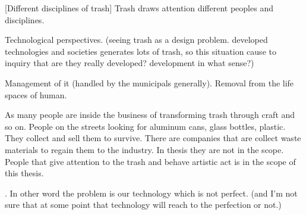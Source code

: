 %
%
[Different disciplines of trash] Trash draws attention different peoples and disciplines. 

 

Technological perspectives. (seeing trash as a design problem. developed technologies and societies generates lots of trash, so this situation cause to inquiry that are they really developed? development in what sense?)

Management of it (handled by the municipals generally). Removal from the life spaces of human.

As many people are inside the business of transforming trash through craft and so on. People on the streets looking for aluminum cans, glass bottles, plastic. They collect and sell them to survive. There are companies that are collect waste materials to regain them to the industry. In thesis they are not in the scope. People that give attention to the trash and behave artistic act is in the scope of this thesis.

  \cite{mcdonough2010cradle}. In other word the problem is our technology which is not perfect. (and I'm not sure that at some point that technology will reach to the perfection or not.)


